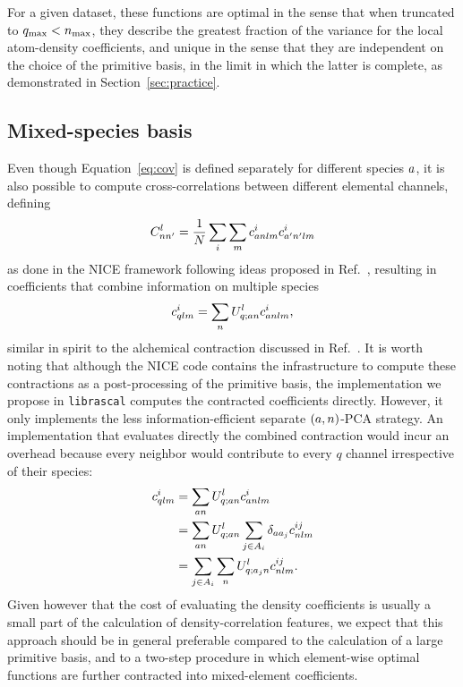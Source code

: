 For a given dataset, these functions are optimal in the sense that when truncated to $q_\mathrm{max}<n_\mathrm{max}$, they describe the greatest fraction of the variance for the local atom-density coefficients, and unique in the sense that they are independent on the choice of the primitive basis, in the limit in which the latter is complete, as demonstrated in Section~\ref{sec:practice}.

\subsection{Mixed-species basis}

Even though Equation~\eqref{eq:cov} is defined separately for different species $a$, it is also possible to compute cross-correlations between different elemental channels, defining
\begin{equation}
  C^{l}_{nn'}= \frac{1}{N} \sum_i \sum_m c^i_{a nlm}c^i_{a^\prime n^\prime lm} 
\label{eq:cov-multispecies}
\end{equation}
as done in the NICE framework\cite{niga+20jcp} following ideas proposed in Ref.~, resulting in coefficients that combine information on multiple species
\begin{equation}
  c^i_{qlm} = \sum_n U^{l}_{q;a n} c^i_{a nlm}, \label{eq:contract-multispecies}
\end{equation}
similar in spirit to the alchemical contraction discussed in Ref.~.
It is worth noting that although the NICE code\cite{NICE-REPO} contains the infrastructure to compute these contractions as a post-processing of the primitive basis, the implementation we propose in \texttt{librascal}\cite{LIBRASCAL} computes the contracted coefficients directly. However, it only implements the less information-efficient separate $(a, n)$-PCA strategy.
An implementation that evaluates directly the combined contraction would incur an overhead because every neighbor would contribute to every $q$ channel irrespective of their species:
\begin{align}
  c^i_{qlm}  &= \sum_{a n} U^l_{q; a n} c^{i}_{a nlm} \\
             &= \sum_{a n} U^l_{q; a n} \sum_{j\in A_i} \delta_{a a_j} c^{ij}_{nlm} \\
             &= \sum_{j\in A_i} \sum_{n} U^l_{q; a_j n} c^{ij}_{nlm}.
\end{align}
Given however that the cost of evaluating the density coefficients is usually a small part of the calculation of density-correlation features\cite{caro2019optimizing,musil2021efficient}, we expect that this approach should be in general preferable compared to the calculation of a large primitive basis, and to a two-step procedure in which element-wise optimal functions are further contracted into mixed-element coefficients.

